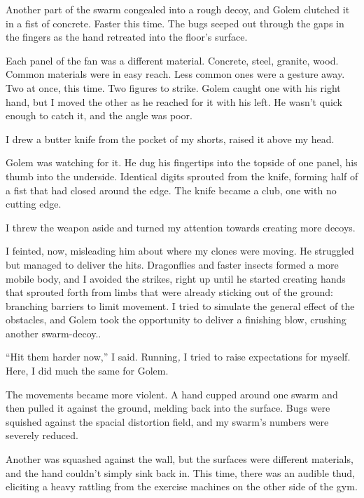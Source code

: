 Another part of the swarm congealed into a rough decoy, and Golem clutched it in a fist of concrete.  Faster this time.  The bugs seeped out through the gaps in the fingers as the hand retreated into the floor's surface.



Each panel of the fan was a different material.  Concrete, steel, granite, wood.  Common materials were in easy reach.  Less common ones were a gesture away.  Two at once, this time.  Two figures to strike.  Golem caught one with his right hand, but I moved the other as he reached for it with his left.  He wasn't quick enough to catch it, and the angle was poor.



I drew a butter knife from the pocket of my shorts, raised it above my head.



Golem was watching for it.  He dug his fingertips into the topside of one panel, his thumb into the underside.  Identical digits sprouted from the knife, forming half of a fist that had closed around the edge.  The knife became a club, one with no cutting edge.



I threw the weapon aside and turned my attention towards creating more decoys.



I feinted, now, misleading him about where my clones were moving.  He struggled but managed to deliver the hits.  Dragonflies and faster insects formed a more mobile body, and I avoided the strikes, right up until he started creating hands that sprouted forth from limbs that were already sticking out of the ground: branching barriers to limit movement.  I tried to simulate the general effect of the obstacles, and Golem took the opportunity to deliver a finishing blow, crushing another swarm-decoy..



``Hit them harder now,'' I said.  Running\emph{, }I tried to raise expectations for myself.  Here, I did much the same for Golem.



The movements became more violent.  A hand cupped around one swarm and then pulled it against the ground, melding back into the surface.  Bugs were squished against the spacial distortion field, and my swarm's numbers were severely reduced.



Another was squashed against the wall, but the surfaces were different materials, and the hand couldn't simply sink back in.  This time, there was an audible thud, eliciting a heavy rattling from the exercise machines on the other side of the gym.




